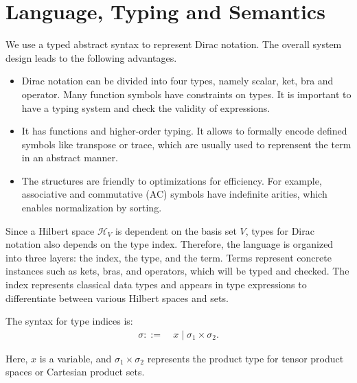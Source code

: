 
\section{Language, Typing and Semantics}
We use a typed abstract syntax to represent Dirac notation. The overall system design leads to the following advantages. 
\begin{itemize}
    \item Dirac notation can be divided into four types, namely scalar, ket, bra and operator. Many function symbols have constraints on types. It is important to have a typing system and check the validity of expressions. 
    \item It has functions and higher-order typing. It allows to formally encode defined symbols like transpose or trace, which are usually used to reprensent the term in an abstract manner. 
    \item The structures are friendly to optimizations for efficiency. For example, associative and commutative (AC) symbols have indefinite arities, which enables normalization by sorting.
\end{itemize}

Since a Hilbert space $\mathcal{H}_V$ is dependent on the basis set $V$,
types for Dirac notation also depends on the type index.
Therefore, the language is organized into three layers: the index, the type, and the term. 
Terms represent concrete instances such as kets, bras, and operators, which will be typed and checked. The index represents classical data types and appears in type expressions to differentiate between various Hilbert spaces and sets.

\begin{definition}
    The syntax for type indices is:
    \begin{align*}
        \sigma ::=\ & x \mid \sigma_1 \times \sigma_2.
    \end{align*}
\end{definition}
Here, \( x \) is a variable, and \( \sigma_1 \times \sigma_2 \) represents the product type for tensor product spaces or Cartesian product sets.


